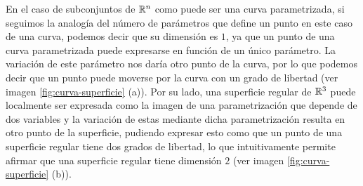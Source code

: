 En el caso de subconjuntos de $\mathbb{R}^n$ como puede ser una curva parametrizada, si seguimos la analogía del número de parámetros que define un punto en este caso de una curva, podemos decir que su dimensión es $1$, ya que un punto de una curva parametrizada puede expresarse en función de un único parámetro. La variación de este parámetro nos daría otro punto de la curva, por lo que podemos decir que un punto puede moverse por la curva con un grado de libertad (ver imagen \ref{fig:curva-superficie} (a)). Por su lado, una superficie regular de $\mathbb{R}^3$ puede localmente ser expresada como la imagen de una parametrización que depende de dos variables y la variación de estas mediante dicha parametrización resulta en otro punto de la superficie, pudiendo expresar esto como que un punto de una superficie regular tiene dos grados de libertad, lo que intuitivamente permite afirmar que una superficie regular tiene dimensión $2$ (ver imagen \ref{fig:curva-superficie} (b)).

